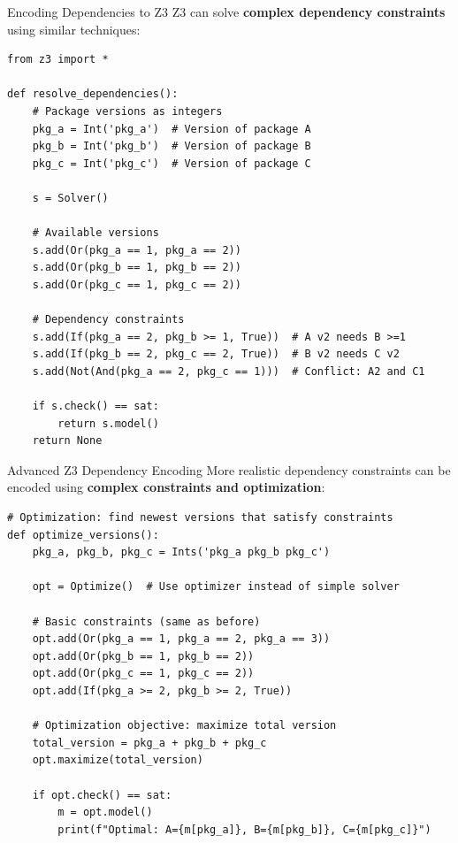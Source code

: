\documentclass{beamer}
\begin{document}
\begin{frame}[fragile,t]{Encoding Dependencies to Z3}
Z3 can solve \textbf{complex dependency constraints} using similar techniques:

\begin{verbatim}
from z3 import *

def resolve_dependencies():
    # Package versions as integers
    pkg_a = Int('pkg_a')  # Version of package A
    pkg_b = Int('pkg_b')  # Version of package B
    pkg_c = Int('pkg_c')  # Version of package C
    
    s = Solver()
    
    # Available versions
    s.add(Or(pkg_a == 1, pkg_a == 2))
    s.add(Or(pkg_b == 1, pkg_b == 2))
    s.add(Or(pkg_c == 1, pkg_c == 2))
    
    # Dependency constraints
    s.add(If(pkg_a == 2, pkg_b >= 1, True))  # A v2 needs B >=1
    s.add(If(pkg_b == 2, pkg_c == 2, True))  # B v2 needs C v2
    s.add(Not(And(pkg_a == 2, pkg_c == 1)))  # Conflict: A2 and C1
    
    if s.check() == sat:
        return s.model()
    return None
\end{verbatim}
\end{frame}

\begin{frame}[fragile,t]{Advanced Z3 Dependency Encoding}
More realistic dependency constraints can be encoded using \textbf{complex constraints and optimization}:

\begin{verbatim}
# Optimization: find newest versions that satisfy constraints
def optimize_versions():
    pkg_a, pkg_b, pkg_c = Ints('pkg_a pkg_b pkg_c')
    
    opt = Optimize()  # Use optimizer instead of simple solver
    
    # Basic constraints (same as before)
    opt.add(Or(pkg_a == 1, pkg_a == 2, pkg_a == 3))
    opt.add(Or(pkg_b == 1, pkg_b == 2))
    opt.add(Or(pkg_c == 1, pkg_c == 2))
    opt.add(If(pkg_a >= 2, pkg_b >= 2, True))
    
    # Optimization objective: maximize total version
    total_version = pkg_a + pkg_b + pkg_c
    opt.maximize(total_version)
    
    if opt.check() == sat:
        m = opt.model()
        print(f"Optimal: A={m[pkg_a]}, B={m[pkg_b]}, C={m[pkg_c]}")
\end{verbatim}
\end{frame}
\end{document}
